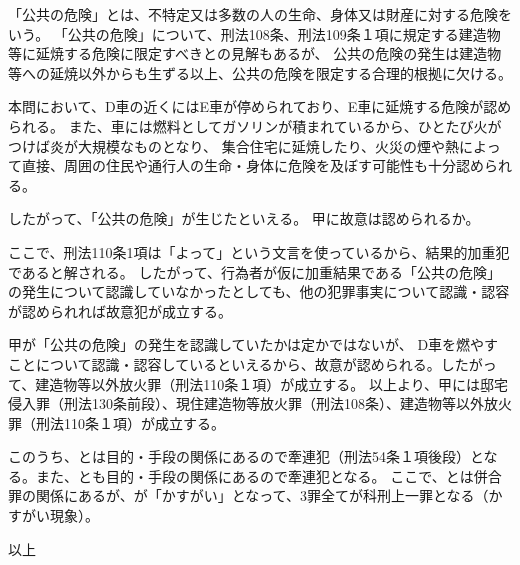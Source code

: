 \documentclass[11pt]{jsarticle}
\begin{document}
		「公共の危険」とは、不特定又は多数の人の生命、身体又は財産に対する危険をいう。
		「公共の危険」について、刑法108条、刑法109条１項に規定する建造物等に延焼する危険に限定すべきとの見解もあるが、
		公共の危険の発生は建造物等への延焼以外からも生ずる以上、公共の危険を限定する合理的根拠に欠ける。
		
		本問において、D車の近くにはE車が停められており、E車に延焼する危険が認められる。
		また、車には燃料としてガソリンが積まれているから、ひとたび火がつけば炎が大規模なものとなり、
		集合住宅に延焼したり、火災の煙や熱によって直接、周囲の住民や通行人の生命・身体に危険を及ぼす可能性も十分認められる。
		
		したがって、「公共の危険」が生じたといえる。
	\sectionB{}
		甲に故意は認められるか。
		
		ここで、刑法110条1項は「よって」という文言を使っているから、結果的加重犯であると解される。
		したがって、行為者が仮に加重結果である「公共の危険」の発生について認識していなかったとしても、他の犯罪事実について認識・認容が認められれば故意犯が成立する。
		
		甲が「公共の危険」の発生を認識していたかは定かではないが、
		D車を燃やすことについて認識・認容しているといえるから、故意が認められる。したがって、建造物等以外放火罪（刑法110条１項）が成立する。
	以上より、甲には邸宅侵入罪（刑法130条前段）、現住建造物等放火罪（刑法108条）、建造物等以外放火罪（刑法110条１項）が成立する。
	
	このうち、とは目的・手段の関係にあるので牽連犯（刑法54条１項後段）となる。また、とも目的・手段の関係にあるので牽連犯となる。
	ここで、とは併合罪の関係にあるが、が「かすがい」となって、3罪全てが科刑上一罪となる（かすがい現象）。
		


\begin{flushright}
	以上
\end{flushright}
	
\end{document}
